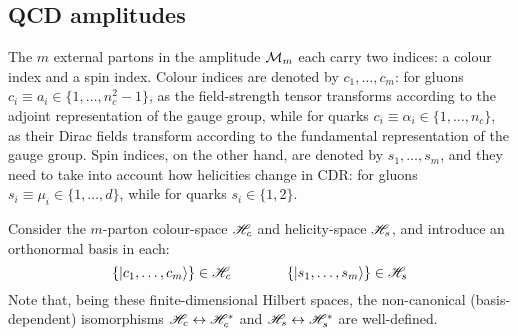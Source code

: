 \subsection{QCD amplitudes}

The $ m $ external partons in the amplitude $ \mathcal{M}_m $ each carry two indices: a colour index and a spin index. Colour indices are denoted by $ c_1, \dots, c_m $: for gluons $ c_i \equiv a_i \in \{1, \dots, n_c^2 - 1\} $, as the field-strength tensor  transforms according to the adjoint representation of the gauge group, while for quarks $ c_i \equiv \alpha_i \in \{1, \dots, n_c\} $, as their Dirac fields transform according to the fundamental representation of the gauge group. Spin indices, on the other hand, are denoted by $ s_1, \dots, s_m $, and they need to take into account how helicities change in CDR: for gluons $ s_i \equiv \mu_i \in \{1, \dots, d\} $, while for quarks $ s_i \in \{1,2\} $.

Consider the $ m $-parton colour-space $ \mathscr{H}_c $ and helicity-space $ \mathscr{H}_s $, and introduce an orthonormal basis in each:
\begin{equation*}
  \{\ket{c_1, \dots, c_m}\} \in \mathscr{H}_c
  \qquad \qquad
  \{\ket{s_1, \dots, s_m}\} \in \mathscr{H}_s
\end{equation*}
Note that, being these finite-dimensional Hilbert spaces, the non-canonical (basis-dependent) isomorphisms $ \mathscr{H}_c \leftrightarrow \mathscr{H}_c^* $ and $ \mathscr{H}_s \leftrightarrow \mathscr{H}_s^* $ are well-defined\footnotemark.


